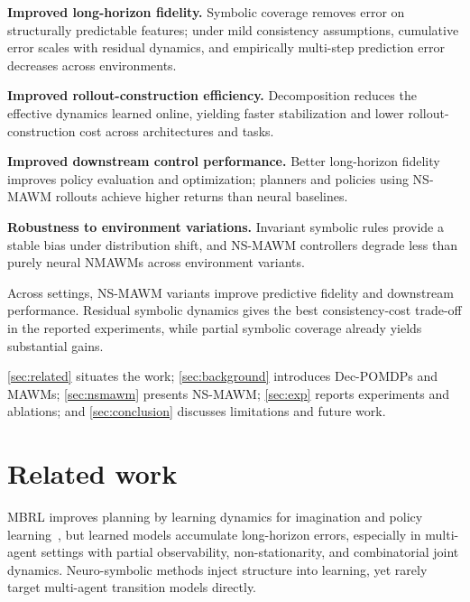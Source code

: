 \documentclass{article}
\theoremstyle{plain}
\theoremstyle{definition}
\theoremstyle{remark}
\begin{document}
\begin{enumerate*}[label={\roman*) },itemjoin={; \quad}]
  \item[\textbf{(C1)}] \textbf{Improved long-horizon fidelity.}
        Symbolic coverage removes error on structurally predictable features; under mild consistency assumptions, cumulative error scales with residual dynamics, and empirically multi-step prediction error decreases across environments.

  \item[\textbf{(C2)}] \textbf{Improved rollout-construction efficiency.}
        Decomposition reduces the effective dynamics learned online, yielding faster stabilization and lower rollout-construction cost across architectures and tasks.

  \item[\textbf{(C3)}] \textbf{Improved downstream control performance.}
        Better long-horizon fidelity improves policy evaluation and optimization; planners and policies using NS-MAWM rollouts achieve higher returns than neural baselines.

  \item[\textbf{(C4)}] \textbf{Robustness to environment variations.}
        Invariant symbolic rules provide a stable bias under distribution shift, and NS-MAWM controllers degrade less than purely neural NMAWMs across environment variants.
\end{enumerate*}
Across settings, NS-MAWM variants improve predictive fidelity and downstream performance. Residual symbolic dynamics gives the best consistency-cost trade-off in the reported experiments, while partial symbolic coverage already yields substantial gains.

\autoref{sec:related} situates the work; \autoref{sec:background} introduces Dec-POMDPs and MAWMs; \autoref{sec:nsmawm} presents NS-MAWM; \autoref{sec:exp} reports experiments and ablations; and \autoref{sec:conclusion} discusses limitations and future work.


\section{Related work}
\label{sec:related}

MBRL improves planning by learning dynamics for imagination and policy learning~\cite{sutton2018reinforcement}, but learned models accumulate long-horizon errors, especially in multi-agent settings with partial observability, non-stationarity, and combinatorial joint dynamics. Neuro-symbolic methods inject structure into learning, yet rarely target multi-agent transition models directly.
\end{document}
